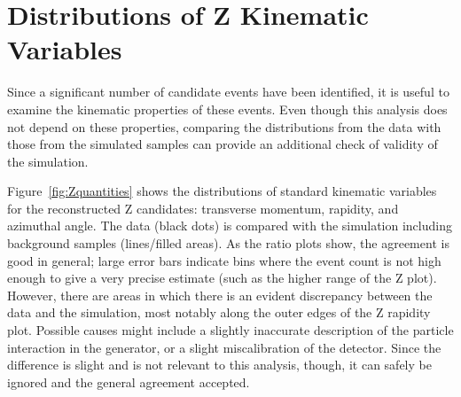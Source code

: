 




\section{Distributions of Z Kinematic Variables} %
\label{res:Zquants}
Since a significant number of \Zee candidate events have been identified, 
it is useful to examine the kinematic properties of these events.  
Even though this analysis does not depend on these properties, 
comparing the distributions from the data with those from the simulated samples 
can provide an additional check of validity of the simulation.  

Figure~\ref{fig:Zquantities} shows the distributions of standard kinematic 
variables for the reconstructed Z candidates: transverse momentum, rapidity, and azimuthal angle. 
The data (black dots) is compared with the simulation including 
background samples (lines/filled areas).  
As the ratio plots show, the agreement is good in general; 
large error bars indicate bins where the event count is not 
high enough to give a very precise estimate 
(such as the higher range of the Z \pt plot).  
However, there are areas in which there is an evident discrepancy 
between the data and the simulation, 
most notably along the outer edges of the Z rapidity plot.  
Possible causes might include a slightly inaccurate description of the particle 
interaction in the generator, 
or a slight miscalibration of the detector.  
Since the difference is slight and is not relevant to this analysis, though, 
it can safely be ignored and the general agreement accepted.  

